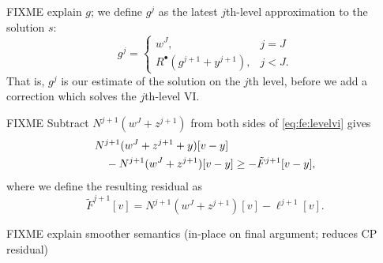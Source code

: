 \documentclass[letterpaper,final,12pt,reqno]{amsart}
\theoremstyle{cstyle}
\theoremstyle{cstyle*}
\theoremstyle{dstyle}
\numberwithin{equation}{section}
\numberwithin{figure}{section}
\numberwithin{table}{section}
\numberwithin{theorem}{section}
\newcommand{\iR}{R^{\bullet}}
\begin{document}
FIXME explain $g$; we define $g^j$ as the latest $j$th-level approximation to the solution $s$:
\begin{equation}
g^j = \begin{cases} w^J, & j=J \\
                    \iR(g^{j+1} + y^{j+1}), & j < J.
      \end{cases}  \label{eq:fe:defineg}
\end{equation}
That is, $g^j$ is our estimate of the solution on the $j$th level, before we add a correction which solves the $j$th-level VI.

FIXME Subtract $N^{j+1}(w^J+z^{j+1})$ from both sides of \eqref{eq:fe:levelvi} gives
\begin{align}
&N^{j+1}(w^J+z^{j+1}+y)[v-y] \label{eq:siaVIFEprecoarsetwo} \\
&\quad - N^{j+1}(w^J+z^{j+1})[v-y] \ge - \tilde F^{j+1}[v-y], \notag
\end{align}
where we define the resulting residual as
\begin{equation}
\tilde F^{j+1}[v] = N^{j+1}(w^J+z^{j+1})[v] - \ell^{j+1}[v].
\end{equation}


FIXME explain smoother semantics (in-place on final argument; reduces CP residual)

\end{document}
